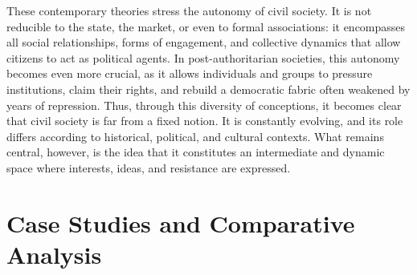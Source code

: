 \documentclass[12pt]{article}
\begin{document}
These contemporary theories stress the autonomy of civil society. It is not reducible to the state, the market, or even to formal associations: it encompasses all social relationships, forms of engagement, and collective dynamics that allow citizens to act as political agents. In post-authoritarian societies, this autonomy becomes even more crucial, as it allows individuals and groups to pressure institutions, claim their rights, and rebuild a democratic fabric often weakened by years of repression.
Thus, through this diversity of conceptions, it becomes clear that civil society is far from a fixed notion. It is constantly evolving, and its role differs according to historical, political, and cultural contexts. What remains central, however, is the idea that it constitutes an intermediate and dynamic space where interests, ideas, and resistance are expressed.



\section{Case Studies and Comparative Analysis}
\end{document}
